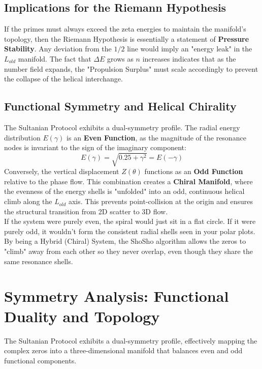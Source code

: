 \documentclass[11pt,a4paper]{article}
\begin{document}
\subsection{Implications for the Riemann Hypothesis}
If the primes must always exceed the zeta energies to maintain the manifold's topology, then the Riemann Hypothesis is essentially a statement of \textbf{Pressure Stability}. Any deviation from the $1/2$ line would imply an "energy leak" in the $L_{old}$ manifold. The fact that $\Delta E$ grows as $n$ increases indicates that as the number field expands, the "Propulsion Surplus" must scale accordingly to prevent the collapse of the helical interchange.\\

\subsection{Functional Symmetry and Helical Chirality}
The Sultanian Protocol exhibits a dual-symmetry profile. The radial energy distribution $E(\gamma)$ is an \textbf{Even Function}, as the magnitude of the resonance nodes is invariant to the sign of the imaginary component:
\begin{equation}
    E(\gamma) = \sqrt{0.25 + \gamma^2} = E(-\gamma)
\end{equation}
Conversely, the vertical displacement $Z(\theta)$ functions as an \textbf{Odd Function} relative to the phase flow. This combination creates a \textbf{Chiral Manifold}, where the evenness of the energy shells is "unfolded" into an odd, continuous helical climb along the $L_{old}$ axis. This prevents point-collision at the origin and ensures the structural transition from 2D scatter to 3D flow. \\

If the system were purely even, the spiral would just sit in a flat circle. If it were purely odd, it wouldn't form the consistent radial shells seen in your polar plots. By being a Hybrid (Chiral) System, the ShoSho algorithm allows the zeros to "climb" away from each other so they never overlap, even though they share the same resonance shells.\\

\section{Symmetry Analysis: Functional Duality and Topology}

The Sultanian Protocol exhibits a dual-symmetry profile, effectively mapping the complex zeros into a three-dimensional manifold that balances even and odd functional components.
\end{document}
